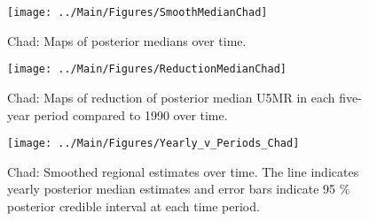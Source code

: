 \documentclass[12pt]{article}\usepackage[]{graphicx}\usepackage[]{color}
\newenvironment{knitrout}{}{} %
\begin{document}
\begin{knitrout}
\color{fgcolor}\begin{figure}[bht]

{\centering \texttt{[image: ../Main/Figures/SmoothMedianChad]} 

}

\caption[Chad]{Chad: Maps of posterior medians over time.}\label{fig:unnamed-chunk-54}
\end{figure}


\end{knitrout}
\begin{knitrout}
\color{fgcolor}\begin{figure}[bht]

{\centering \texttt{[image: ../Main/Figures/ReductionMedianChad]} 

}

\caption[Chad]{Chad: Maps of reduction of posterior median U5MR in each five-year period compared to 1990 over time.}\label{fig:unnamed-chunk-55}
\end{figure}


\end{knitrout}
\begin{knitrout}
\color{fgcolor}\begin{figure}[bht]

{\centering \texttt{[image: ../Main/Figures/Yearly\_v\_Periods\_Chad]} 

}

\caption[Chad]{Chad: Smoothed regional estimates over time. The line indicates yearly posterior median estimates and error bars indicate 95 \% posterior credible interval at each time period.}\label{fig:unnamed-chunk-56}
\end{figure}


\end{knitrout}
\end{document}
